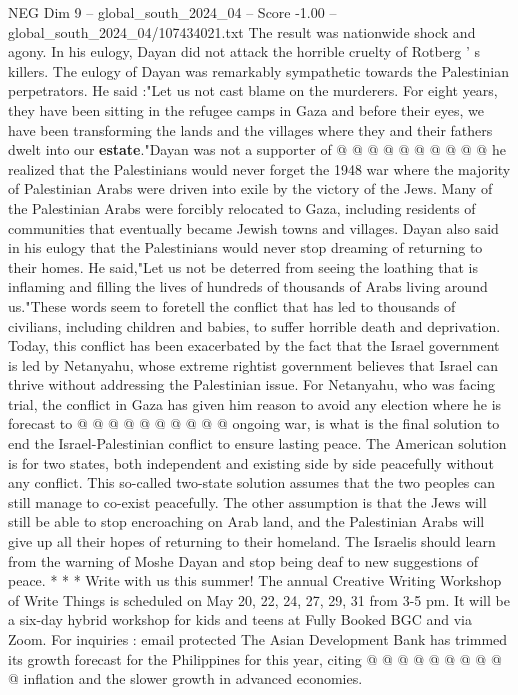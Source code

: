 \begin{textsample}{NEG Dim 9 – global\_south\_2024\_04 – Score -1.00 – global\_south\_2024\_04/107434021.txt}
The result was nationwide shock and agony.
In his eulogy, Dayan did not attack the horrible cruelty of Rotberg ' s killers.
The eulogy of Dayan was remarkably sympathetic towards the Palestinian perpetrators.
He said :"Let us not cast blame on the murderers.
For eight years, they have been sitting in the refugee camps in Gaza and before their eyes, we have been transforming the lands and the villages where they and their fathers dwelt into our \textbf{estate}."Dayan was not a supporter of @ @ @ @ @ @ @ @ @ @ he realized that the Palestinians would never forget the 1948 war where the majority of Palestinian Arabs were driven into exile by the victory of the Jews.
Many of the Palestinian Arabs were forcibly relocated to Gaza, including residents of communities that eventually became Jewish towns and villages.
Dayan also said in his eulogy that the Palestinians would never stop dreaming of returning to their homes.
He said,"Let us not be deterred from seeing the loathing that is inflaming and filling the lives of hundreds of thousands of Arabs living around us."These words seem to foretell the conflict that has led to thousands of civilians, including children and babies, to suffer horrible death and deprivation.
Today, this conflict has been exacerbated by the fact that the Israel government is led by Netanyahu, whose extreme rightist government believes that Israel can thrive without addressing the Palestinian issue.
For Netanyahu, who was facing trial, the conflict in Gaza has given him reason to avoid any election where he is forecast to @ @ @ @ @ @ @ @ @ @ ongoing war, is what is the final solution to end the Israel-Palestinian conflict to ensure lasting peace.
The American solution is for two states, both independent and existing side by side peacefully without any conflict.
This so-called two-state solution assumes that the two peoples can still manage to co-exist peacefully.
The other assumption is that the Jews will still be able to stop encroaching on Arab land, and the Palestinian Arabs will give up all their hopes of returning to their homeland.
The Israelis should learn from the warning of Moshe Dayan and stop being deaf to new suggestions of peace. * * * Write with us this summer!
The annual Creative Writing Workshop of Write Things is scheduled on May 20, 22, 24, 27, 29, 31 from 3-5 pm.
It will be a six-day hybrid workshop for kids and teens at Fully Booked BGC and via Zoom.
For inquiries : email protected The Asian Development Bank has trimmed its growth forecast for the Philippines for this year, citing @ @ @ @ @ @ @ @ @ @ inflation and the slower growth in advanced economies.

\end{textsample}
